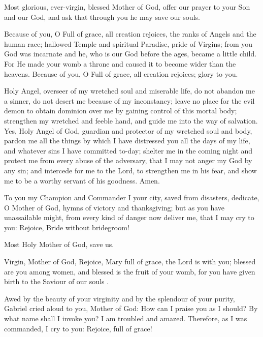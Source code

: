 
Most glorious, ever-virgin, blessed Mother of God, offer our prayer to your Son and our God, and ask that through you he may save our souls.


\joannicius


\allmyhope

Because of you, O Full of grace, all creation rejoices, the ranks of Angels and the human race; hallowed Temple and spiritual Paradise, pride of Virgins; from you God was incarnate and he, who is our God before the ages, became a little child. For He made your womb a throne and caused it to become wider than the heavens. Because of you, O Full of grace, all creation rejoices; glory to you.


Holy Angel, overseer of my wretched soul and miserable life, do not abandon me a sinner, do not desert me because of my inconstancy; leave no place for the evil demon to obtain dominion over me by gaining control of this mortal body; strengthen my wretched and feeble hand, and guide me into the way of salvation. Yes, Holy Angel of God, guardian and protector of my wretched soul and body, pardon me all the things by which I have distressed you all the days of my life, and whatever sins I have committed to-day; shelter me in the coming night and protect me from every abuse of the adversary, that I may not anger my God by any sin; and intercede for me to the Lord, to strengthen me in his fear, and show me to be a worthy servant of his goodness. Amen.


To you my Champion and Commander I your city, saved from disasters, dedicate, O Mother of God, hymns of victory and thanksgiving; but as you have unassailable might, from every kind of danger now deliver me, that I may cry to you: Rejoice, Bride without bridegroom!

Most Holy Mother of God, save us.


Virgin, Mother of God, Rejoice, Mary full of grace, the Lord is with you; blessed are you among women, and blessed is the fruit of your womb, for you have given birth to the Saviour of our souls .


\glorybothnow



Awed by the beauty of your virginity and by the splendour of your purity, Gabriel cried aloud to you, Mother of God: How can I praise you as I should? By what name shall I invoke you? I am troubled and amazed. Therefore, as I was commanded, I cry to you: Rejoice, full of grace!

\throughtheprayers
